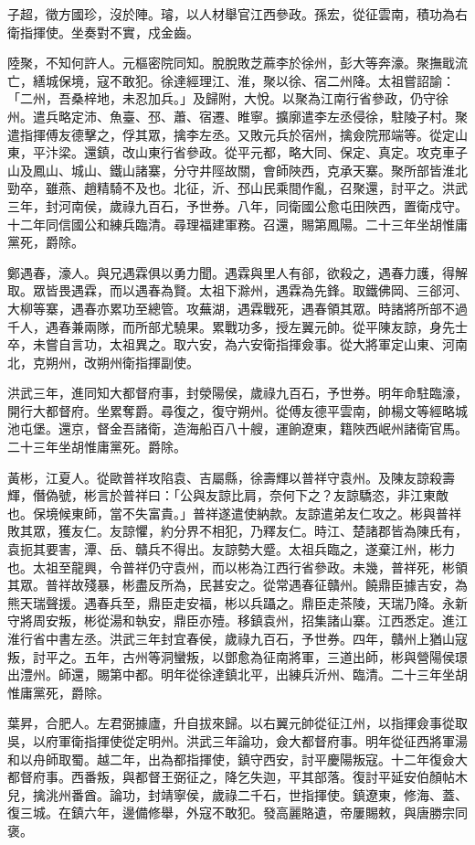\begin{pinyinscope}
子超，徵方國珍，沒於陣。璿，以人材舉官江西參政。孫宏，從征雲南，積功為右衛指揮使。坐奏對不實，戍金齒。

陸聚，不知何許人。元樞密院同知。脫脫敗芝蔴李於徐州，彭大等奔濠。聚撫戢流亡，繕城保境，寇不敢犯。徐達經理江、淮，聚以徐、宿二州降。太祖嘗詔諭：「二州，吾桑梓地，未忍加兵。」及歸附，大悅。以聚為江南行省參政，仍守徐州。遣兵略定沛、魚臺、邳、蕭、宿遷、睢寧。擴廓遣李左丞侵徐，駐陵子村。聚遣指揮傅友德擊之，俘其眾，擒李左丞。又敗元兵於宿州，擒僉院邢端等。從定山東，平汴梁。還鎮，改山東行省參政。從平元都，略大同、保定、真定。攻克車子山及鳳山、城山、鐵山諸寨，分守井陘故關，會師陜西，克承天寨。聚所部皆淮北勁卒，雖燕、趙精騎不及也。北征，沂、邳山民乘間作亂，召聚還，討平之。洪武三年，封河南侯，歲祿九百石，予世券。八年，同衛國公愈屯田陜西，置衛戍守。十二年同信國公和練兵臨清。尋理福建軍務。召還，賜第鳳陽。二十三年坐胡惟庸黨死，爵除。

鄭遇春，濠人。與兄遇霖俱以勇力聞。遇霖與里人有郤，欲殺之，遇春力護，得解取。眾皆畏遇霖，而以遇春為賢。太祖下滁州，遇霖為先鋒。取鐵佛岡、三郤河、大柳等寨，遇春亦累功至總管。攻蕪湖，遇霖戰死，遇春領其眾。時諸將所部不過千人，遇春兼兩隊，而所部尤驍果。累戰功多，授左翼元帥。從平陳友諒，身先士卒，未嘗自言功，太祖異之。取六安，為六安衛指揮僉事。從大將軍定山東、河南北，克朔州，改朔州衛指揮副使。

洪武三年，進同知大都督府事，封滎陽侯，歲祿九百石，予世券。明年命駐臨濠，開行大都督府。坐累奪爵。尋復之，復守朔州。從傅友德平雲南，帥楊文等經略城池屯堡。還京，督金吾諸衛，造海船百八十艘，運餉遼東，籍陜西岷州諸衛官馬。二十三年坐胡惟庸黨死。爵除。

黃彬，江夏人。從歐普祥攻陷袁、吉屬縣，徐壽輝以普祥守袁州。及陳友諒殺壽輝，僭偽號，彬言於普祥曰：「公與友諒比肩，奈何下之？友諒驕恣，非江東敵也。保境候東師，當不失富貴。」普祥遂遣使納款。友諒遣弟友仁攻之。彬與普祥敗其眾，獲友仁。友諒懼，約分界不相犯，乃釋友仁。時江、楚諸郡皆為陳氏有，袁扼其要害，潭、岳、贛兵不得出。友諒勢大蹙。太祖兵臨之，遂棄江州，彬力也。太祖至龍興，令普祥仍守袁州，而以彬為江西行省參政。未幾，普祥死，彬領其眾。普祥故殘暴，彬盡反所為，民甚安之。從常遇春征贛州。饒鼎臣據吉安，為熊天瑞聲援。遇春兵至，鼎臣走安福，彬以兵躡之。鼎臣走茶陵，天瑞乃降。永新守將周安叛，彬從湯和執安，鼎臣亦殪。移鎮袁州，招集諸山寨。江西悉定。進江淮行省中書左丞。洪武三年封宜春侯，歲祿九百石，予世券。四年，贛州上猶山寇叛，討平之。五年，古州等洞蠻叛，以鄧愈為征南將軍，三道出師，彬與營陽侯璟出澧州。師還，賜第中都。明年從徐達鎮北平，出練兵沂州、臨清。二十三年坐胡惟庸黨死，爵除。

葉昇，合肥人。左君弼據廬，升自拔來歸。以右翼元帥從征江州，以指揮僉事從取吳，以府軍衛指揮使從定明州。洪武三年論功，僉大都督府事。明年從征西將軍湯和以舟師取蜀。越二年，出為都指揮使，鎮守西安，討平慶陽叛寇。十二年復僉大都督府事。西番叛，與都督王弼征之，降乞失迦，平其部落。復討平延安伯顏帖木兒，擒洮州番酋。論功，封靖寧侯，歲祿二千石，世指揮使。鎮遼東，修海、蓋、復三城。在鎮六年，邊備修舉，外寇不敢犯。發高麗賂遺，帝屢賜敕，與唐勝宗同褒。


\end{pinyinscope}

